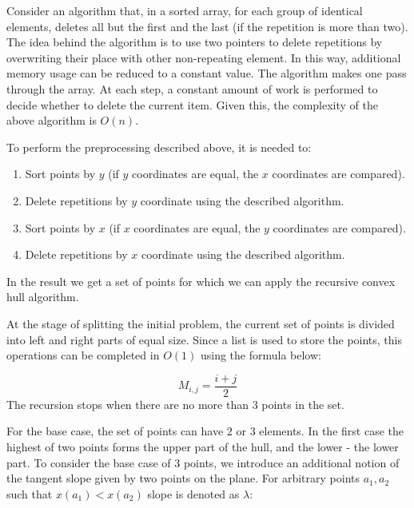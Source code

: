 \documentclass[sigconf]{acmart}
\begin{document}
		Consider an algorithm that, in a sorted array, for each group of identical elements, deletes all but the first and the last (if the repetition is more than two). The idea behind the algorithm is to use two pointers to delete repetitions by overwriting their place with other non-repeating element. In this way, additional memory usage can be reduced to a constant value. The algorithm makes one pass through the array. At each step, a constant amount of work is performed to decide whether to delete the current item. Given this, the complexity of the above algorithm is $O(n)$.
		
		To perform the preprocessing described above, it is needed to:
		
		\begin{enumerate}
			\item
			Sort points by $y$ (if $y$ coordinates are equal, the $x$ coordinates are compared).
			\item
			Delete repetitions by $y$ coordinate using the described algorithm.
			\item
			Sort points by $x$ (if $x$ coordinates are equal, the $y$ coordinates are compared).
			\item
			Delete repetitions by $x$ coordinate using the described algorithm.
		\end{enumerate}
	
		In the result we get a set of points for which we can apply the recursive convex hull algorithm.
		

		
		At the stage of splitting the initial problem, the current set of points is divided into left and right parts of equal size. Since a list is used to store the points, this operations can be completed in $O(1)$ using the formula below:
		
		\begin{equation}
			M_{i,j}=\frac{i+j}{2}
		\end{equation}
		The recursion stops when there are no more than $3$ points in the set.
		
		For the base case, the set of points can have $2$ or $3$ elements. In the first case the highest of two points forms the upper part of the hull, and the lower - the lower part.
		To consider the base case of $3$ points, we introduce an additional notion of the tangent slope given by two points on the plane. For arbitrary points $a_1, a_2$ such that $x(a_1)<x(a_2)$ slope is denoted as $\lambda$:
		
\end{document}
